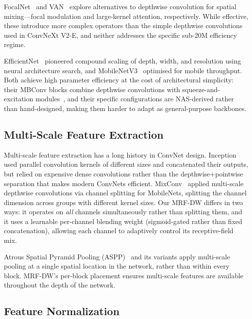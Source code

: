 \documentclass{article}
\begin{document}
FocalNet~\cite{yang2022focal} and
VAN~\cite{guo2022visual} explore alternatives to depthwise convolution
for spatial mixing---focal modulation and large-kernel attention,
respectively.  While effective, these introduce more complex operators
than the simple depthwise convolutions used in ConvNeXt V2-E, and
neither addresses the specific sub-20M efficiency regime.

EfficientNet~\cite{tan2019efficientnet} pioneered compound scaling of
depth, width, and resolution using neural architecture search, and
MobileNetV3~\cite{howard2019mobilenetv3} optimised for mobile
throughput.  Both achieve high parameter efficiency at the cost of
architectural simplicity: their MBConv blocks combine depthwise
convolutions with squeeze-and-excitation
modules~\cite{hu2018squeeze}, and their specific configurations are
NAS-derived rather than hand-designed, making them harder to adapt
as general-purpose backbones.

\subsection{Multi-Scale Feature Extraction}

Multi-scale feature extraction has a long history in ConvNet design.
Inception~\cite{szegedy2015inception} used parallel convolution kernels
of different sizes and concatenated their outputs, but relied on
expensive dense convolutions rather than the depthwise+pointwise
separation that makes modern ConvNets efficient.
MixConv~\cite{tan2019mixconv} applied multi-scale depthwise
convolutions via channel splitting for MobileNets, splitting the
channel dimension across groups with different kernel sizes.
Our MRF-DW differs in two ways: it operates on \emph{all} channels
simultaneously rather than splitting them, and it uses a learnable
per-channel blending weight (sigmoid-gated rather than fixed
concatenation), allowing each channel to adaptively control its
receptive-field mix.

Atrous Spatial Pyramid Pooling (ASPP)~\cite{chen2017deeplab} and
its variants apply multi-scale pooling at a single spatial location
in the network, rather than within every block.  MRF-DW's per-block
placement ensures multi-scale features are available throughout the
depth of the network.

\subsection{Feature Normalization}
\end{document}
